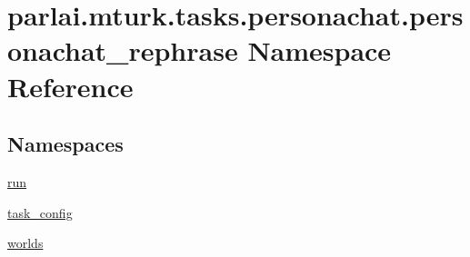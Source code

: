 \hypertarget{namespaceparlai_1_1mturk_1_1tasks_1_1personachat_1_1personachat__rephrase}{}\section{parlai.\+mturk.\+tasks.\+personachat.\+personachat\+\_\+rephrase Namespace Reference}
\label{namespaceparlai_1_1mturk_1_1tasks_1_1personachat_1_1personachat__rephrase}
\subsection*{Namespaces}
\begin{DoxyCompactItemize}
\item 
 \hyperlink{namespaceparlai_1_1mturk_1_1tasks_1_1personachat_1_1personachat__rephrase_1_1run}{run}
\item 
 \hyperlink{namespaceparlai_1_1mturk_1_1tasks_1_1personachat_1_1personachat__rephrase_1_1task__config}{task\+\_\+config}
\item 
 \hyperlink{namespaceparlai_1_1mturk_1_1tasks_1_1personachat_1_1personachat__rephrase_1_1worlds}{worlds}
\end{DoxyCompactItemize}
